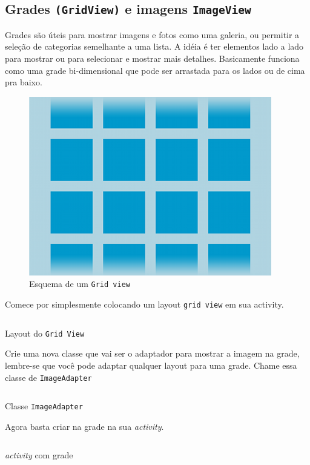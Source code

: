 \documentclass[a4paper,12pt,brazil,doubleside]{book}
\begin{document}
\begin{singlespace}

\section{Grades \texttt{(GridView)} e imagens \texttt{ImageView}}

Grades são úteis para mostrar imagens e fotos como uma galeria, ou permitir a seleção de categorias semelhante a uma lista. A idéia é ter elementos lado a lado para mostrar ou para selecionar e mostrar mais detalhes. Basicamente funciona como uma grade bi-dimensional que pode ser arrastada para os lados ou de cima pra baixo. 

\begin{figure}[H]
  \centering
  \includegraphics[width=.475\textwidth]{figuras/design/gridview.png}
  \caption{Esquema de um \texttt{Grid view}}
  \label{fig:e}
\end{figure}

\newpage 
Comece por simplesmente colocando um layout \texttt{grid view} em sua activity.

\begin{listing}[H]
\inputminted[linenos=true,fontsize=\small,frame=lines, framesep=2mm, tabsize=2,numbersep=5pt]{xml}{src/design/gridview.xml}
\caption{Layout do \texttt{Grid View}}
\end{listing}	
\newpage
Crie uma nova classe que vai ser o adaptador para mostrar a imagem na grade, lembre-se que você pode adaptar qualquer layout para uma grade. Chame essa classe de \texttt{ImageAdapter}

\begin{listing}[H]
\inputminted[linenos=true,fontsize=\small,frame=lines, framesep=2mm, tabsize=2,numbersep=5pt]{java}{src/design/imageadapter.java}
\caption{Classe \texttt{ImageAdapter}}
\end{listing}	

Agora basta criar na grade na sua \emph{activity}.

\begin{listing}[H]
\inputminted[linenos=true,fontsize=\small,frame=lines, framesep=2mm, tabsize=2,numbersep=5pt]{java}{src/design/grade-activity.java}
\caption{\emph{activity} com grade}
\end{listing}	


\end{singlespace}
\end{document}

